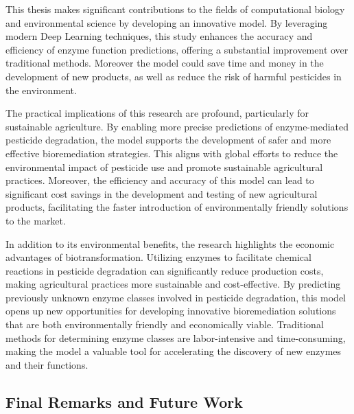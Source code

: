 This thesis makes significant contributions to the fields of computational biology and environmental science by developing an innovative model. By leveraging modern Deep Learning techniques, this study enhances the accuracy and efficiency of enzyme function predictions, offering a substantial improvement over traditional methods. Moreover the model could save time and money in the development of new products, as well as reduce the risk of harmful pesticides in the environment.

The practical implications of this research are profound, particularly for sustainable agriculture. By enabling more precise predictions of enzyme-mediated pesticide degradation, the model supports the development of safer and more effective bioremediation strategies. This aligns with global efforts to reduce the environmental impact of pesticide use and promote sustainable agricultural practices. Moreover, the efficiency and accuracy of this model can lead to significant cost savings in the development and testing of new agricultural products, facilitating the faster introduction of environmentally friendly solutions to the market.

In addition to its environmental benefits, the research highlights the economic advantages of biotransformation. Utilizing enzymes to facilitate chemical reactions in pesticide degradation can significantly reduce production costs, making agricultural practices more sustainable and cost-effective. By predicting previously unknown enzyme classes involved in pesticide degradation, this model opens up new opportunities for developing innovative bioremediation solutions that are both environmentally friendly and economically viable. Traditional methods for determining enzyme classes are labor-intensive and time-consuming, making the model a valuable tool for accelerating the discovery of new enzymes and their functions.

\subsection{Final Remarks and Future Work}
\label{sec:Final Remarks and Future Work}

